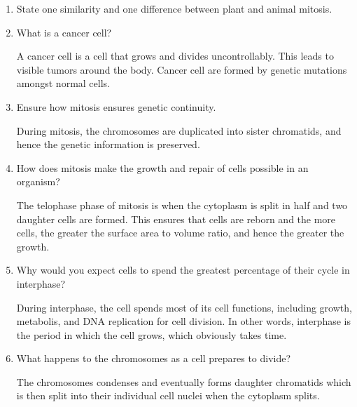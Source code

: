 \documentclass[12pt]{report}
\begin{document}
\begin{enumerate}
        \item{State one similarity and one difference between plant and animal mitosis.}

        \item{What is a cancer cell?}
            \begin{solution}
                A cancer cell is a cell that grows and divides uncontrollably. This leads to visible tumors around the body. Cancer cell are formed by genetic mutations amongst normal cells.  
            \end{solution}

        \item{Ensure how mitosis ensures genetic continuity.}
            \begin{solution}
                During mitosis, the chromosomes are duplicated into sister chromatids, and hence the genetic information is preserved.
            \end{solution}

        \item{How does mitosis make the growth and repair of cells possible in an organism?}
            \begin{solution}
                The telophase phase of mitosis is when the cytoplasm is split in half and two daughter cells are formed. This ensures that cells are reborn and the more cells, the greater the surface area to volume ratio, and hence the greater the growth.
            \end{solution}

        \item{Why would you expect cells to spend the greatest percentage of their cycle in interphase?}
        \begin{solution}
            During interphase, the cell spends most of its cell functions, including growth, metabolis, and DNA replication for cell division. In other words, interphase is the period in which the cell grows, which obviously takes time.
        \end{solution}

        \item{What happens to the chromosomes as a cell prepares to divide?}
            \begin{solution}
                The chromosomes condenses and eventually forms daughter chromatids which is then split into their individual cell nuclei when the cytoplasm splits.
            \end{solution}


\end{enumerate}
\end{document}
